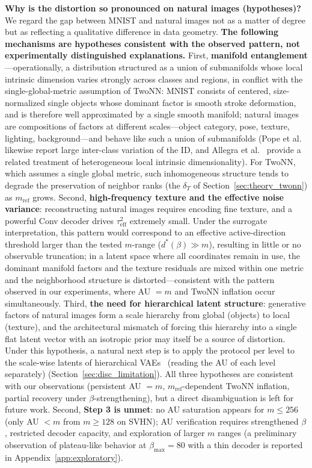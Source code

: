 \documentclass[make,article,submit,pdftex,moreauthors]{Definitions/mdpi}
\newcommand{\dstar}{d^{*}(\beta)}
\begin{document}
\textbf{Why is the distortion so pronounced on natural images
(hypotheses)?}
We regard the gap between MNIST and natural images not as a matter of
degree but as reflecting a qualitative difference in data geometry.
\textbf{The following mechanisms are hypotheses consistent with the
observed pattern, not experimentally distinguished explanations.}
First, \textbf{manifold entanglement}---operationally, a distribution
structured as a union of submanifolds whose local intrinsic dimension
varies strongly across classes and regions, in conflict with the
single-global-metric assumption of TwoNN: MNIST consists of centered,
size-normalized single objects whose dominant factor is smooth stroke
deformation, and is therefore well approximated by a single smooth
manifold; natural images are compositions of factors at different
scales---object category, pose, texture, lighting, background---and behave
like such a union of submanifolds (Pope et
al.~\cite{pope2021intrinsic} likewise report large inter-class variation
of the ID, and Allegra et al.~\cite{allegra2020data} provide a related
treatment of heterogeneous local intrinsic dimensionality).
For TwoNN, which assumes a single global metric, such inhomogeneous
structure tends to degrade the preservation of neighbor ranks (the
$\delta_T$ of Section~\ref{sec:theory_twonn}) as $m_{\mathrm{ref}}$
grows.
Second, \textbf{high-frequency texture and the effective noise variance}:
reconstructing natural images requires encoding fine texture, and a
powerful Conv decoder drives $\tau^2_{\mathrm{eff}}$ extremely small.
Under the surrogate interpretation, this pattern would correspond to an
effective active-direction threshold larger than the tested $m$-range
($\dstar \gg m$), resulting in little or no observable truncation; in a
latent space where
all coordinates remain in use, the dominant manifold factors and the
texture residuals are mixed within one metric and the neighborhood
structure is distorted---consistent with the pattern observed in our
experiments, where AU $= m$ and TwoNN inflation occur simultaneously.
Third, \textbf{the need for hierarchical latent structure}: generative
factors of natural images form a scale hierarchy from global (objects) to
local (texture), and the architectural mismatch of forcing this hierarchy
into a single flat latent vector with an isotropic prior may itself be a
source of distortion.
Under this hypothesis, a natural next step is to apply the protocol
per level to the scale-wise latents of hierarchical
VAEs~\cite{sonderby2016ladder} (reading the AU of each level separately)
(Section~\ref{sec:disc_limitation}).
All three hypotheses are consistent with our observations (persistent
AU $= m$, $m_{\mathrm{ref}}$-dependent TwoNN inflation, partial recovery
under $\beta$-strengthening), but a direct disambiguation is left for
future work.
Second, \textbf{Step 3 is unmet}: no AU saturation appears for
$m \leq 256$ (only AU $< m$ from $m \geq 128$ on SVHN); AU verification
requires strengthened $\beta$, restricted decoder capacity, and exploration
of larger $m$ ranges (a preliminary observation of plateau-like behavior at
$\beta_{\max} = 80$ with a thin decoder is reported in
Appendix~\ref{app:exploratory}).
\end{document}
